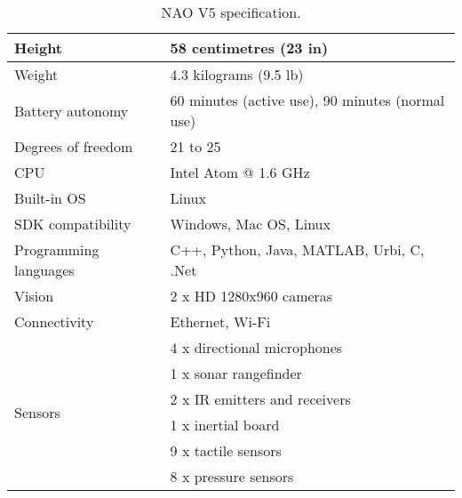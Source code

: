 \begin{table}
	[h] \centering \caption{NAO V5 specification. \cite{8} } \label{tb:nao:spec} 
	\begin{tabular}
		{|l|l|} \hline Height & 58 centimetres (23 in) \\
		\hline Weight & 4.3 kilograms (9.5 lb) \\
		\hline Battery autonomy & 60 minutes (active use), 90 minutes (normal use) \\
		\hline Degrees of freedom & 21 to 25 \\
		\hline CPU & Intel Atom @ 1.6 GHz \\
		\hline Built-in OS & Linux \\
		\hline SDK compatibility & Windows, Mac OS, Linux \\
		\hline Programming languages & C++, Python, Java, MATLAB, Urbi, C, .Net \\
		\hline Vision & 2 x HD 1280x960 cameras \\
		\hline Connectivity & Ethernet, Wi-Fi \\
		\hline \multirow{6}{*}{Sensors} & 4 x directional microphones \\
		& 1 x sonar rangefinder \\
		& 2 x IR emitters and receivers \\
		& 1 x inertial board \\
		& 9 x tactile sensors \\
		& 8 x pressure sensors \\
		\hline 
	\end{tabular}
\end{table}
